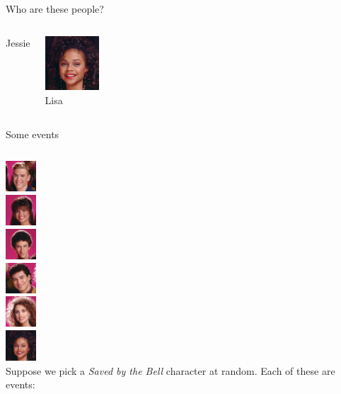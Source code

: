 \documentclass{beamer}\usepackage[]{graphicx}\usepackage[]{color}
\begin{document}
\begin{darkframes}
\begin{frame}{Who are these people?}
\begin{columns}[onlytextwidth]
\begin{center}
            Jessie
          \end{center}
          \begin{center}
            \includegraphics[width=0.8in]{lisa} \\
            Lisa
          \end{center}
      \end{columns}
    \end{frame}

    \begin{frame}{Some events}
      \begin{columns}[onlytextwidth]
          \includegraphics[width=0.45in]{zack} \\
          \includegraphics[width=0.45in]{kelly} \\
          \includegraphics[width=0.45in]{screech} \\
          \includegraphics[width=0.45in]{slater} \\
          \includegraphics[width=0.45in]{jessie} \\
          \includegraphics[width=0.45in]{lisa} \\
          Suppose we pick a \emph{Saved by the Bell} character at random. Each of these are events:

\end{columns}
\end{frame}
\end{darkframes}
\end{document}
